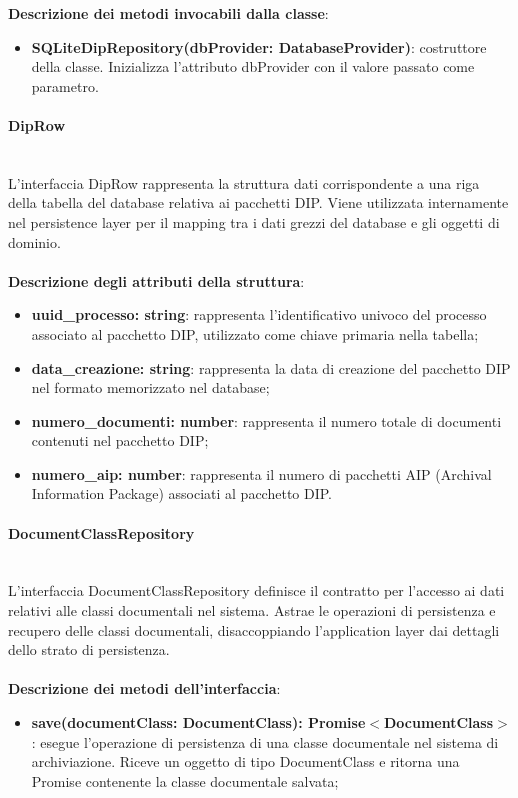 \documentclass[a4paper,12pt]{article}
\begin{document}
{{{              \noindent \textbf{Descrizione dei metodi invocabili dalla classe}:
                \begin{itemize}
                    \item \textbf{SQLiteDipRepository(dbProvider: DatabaseProvider)}: costruttore della classe. Inizializza l'attributo dbProvider con il valore passato come parametro.
                \end{itemize}
                \paragraph{DipRow}\label{par:DipRow}\mbox{}\\
                L'interfaccia DipRow rappresenta la struttura dati corrispondente a una riga della tabella del database relativa ai pacchetti DIP. Viene utilizzata internamente nel persistence layer per il mapping tra i dati grezzi del database e gli oggetti di dominio.\\
                \\
                \textbf{Descrizione degli attributi della struttura}:
                \begin{itemize}
                    \item \textbf{uuid\_processo: string}: rappresenta l'identificativo univoco del processo associato al pacchetto DIP, utilizzato come chiave primaria nella tabella;
                    \item \textbf{data\_creazione: string}: rappresenta la data di creazione del pacchetto DIP nel formato memorizzato nel database;
                    \item \textbf{numero\_documenti: number}: rappresenta il numero totale di documenti contenuti nel pacchetto DIP;
                    \item \textbf{numero\_aip: number}: rappresenta il numero di pacchetti AIP (Archival Information Package) associati al pacchetto DIP.
                \end{itemize}
                \paragraph{DocumentClassRepository}\label{par:DocumentClassRepository}\mbox{}\\
                L'interfaccia DocumentClassRepository definisce il contratto per l'accesso ai dati relativi alle classi documentali nel sistema. Astrae le operazioni di persistenza e recupero delle classi documentali, disaccoppiando l'application layer dai dettagli dello strato di persistenza.\\
                \\
              \noindent \textbf{Descrizione dei metodi dell'interfaccia}:
                \begin{itemize}
                    \item \textbf{save(documentClass: DocumentClass): Promise$<$DocumentClass$>$}: esegue l'operazione di persistenza di una classe documentale nel sistema di archiviazione. Riceve un oggetto di tipo DocumentClass e ritorna una Promise contenente la classe documentale salvata;
                \end{itemize}
}}}
\end{document}

